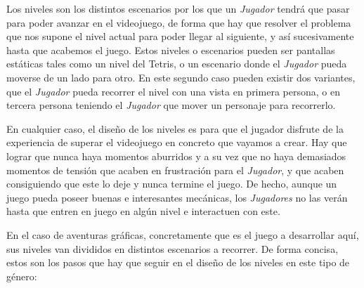 
Los niveles son los distintos escenarios por los que un \emph{Jugador} tendrá que pasar para poder avanzar en el videojuego, de forma que  hay que resolver el problema que nos supone el nivel actual para poder llegar al siguiente, y así sucesivamente hasta que acabemos el juego. Estos niveles o escenarios pueden ser pantallas estáticas tales como un nivel del Tetris, o un escenario donde el \emph{Jugador} pueda moverse de un lado para otro. En este segundo caso pueden existir dos variantes, que el \emph{Jugador} pueda recorrer el nivel con una vista en primera persona, o en tercera persona teniendo el \emph{Jugador} que mover un personaje para recorrerlo.

En cualquier caso, el diseño de los niveles es  para que el jugador disfrute de la experiencia de superar el videojuego en concreto que vayamos a crear. Hay que lograr que nunca haya momentos aburridos y a su vez que no haya demasiados momentos de tensión que acaben en frustración para el \emph{Jugador}, y que acaben consiguiendo que este lo deje y nunca termine el juego. De hecho, aunque un juego pueda poseer buenas e interesantes mecánicas, los \emph{Jugadores} no las verán hasta que entren en juego en algún nivel e interactuen con este.


En el caso de aventuras gráficas, concretamente \nombrejuego que es el juego a desarrollar aquí, sus niveles van divididos en distintos escenarios a recorrer. De forma concisa, estos son los pasos que hay que seguir en el diseño de los niveles en este tipo de género:

